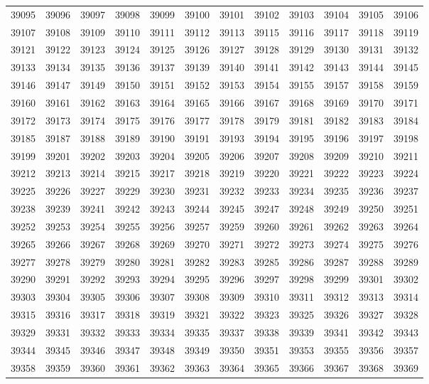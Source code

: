\begin{center}
\begin{longtable}{llllllllllll}
39095 &39096 &39097 &39098 &39099 &39100 &39101 &39102 &39103 &39104 &39105 &39106 \\
39107 &39108 &39109 &39110 &39111 &39112 &39113 &39115 &39116 &39117 &39118 &39119 \\
39121 &39122 &39123 &39124 &39125 &39126 &39127 &39128 &39129 &39130 &39131 &39132 \\
39133 &39134 &39135 &39136 &39137 &39139 &39140 &39141 &39142 &39143 &39144 &39145 \\
39146 &39147 &39149 &39150 &39151 &39152 &39153 &39154 &39155 &39157 &39158 &39159 \\
39160 &39161 &39162 &39163 &39164 &39165 &39166 &39167 &39168 &39169 &39170 &39171 \\
39172 &39173 &39174 &39175 &39176 &39177 &39178 &39179 &39181 &39182 &39183 &39184 \\
39185 &39187 &39188 &39189 &39190 &39191 &39193 &39194 &39195 &39196 &39197 &39198 \\
39199 &39201 &39202 &39203 &39204 &39205 &39206 &39207 &39208 &39209 &39210 &39211 \\
39212 &39213 &39214 &39215 &39217 &39218 &39219 &39220 &39221 &39222 &39223 &39224 \\
39225 &39226 &39227 &39229 &39230 &39231 &39232 &39233 &39234 &39235 &39236 &39237 \\
39238 &39239 &39241 &39242 &39243 &39244 &39245 &39247 &39248 &39249 &39250 &39251 \\
39252 &39253 &39254 &39255 &39256 &39257 &39259 &39260 &39261 &39262 &39263 &39264 \\
39265 &39266 &39267 &39268 &39269 &39270 &39271 &39272 &39273 &39274 &39275 &39276 \\
39277 &39278 &39279 &39280 &39281 &39282 &39283 &39285 &39286 &39287 &39288 &39289 \\
39290 &39291 &39292 &39293 &39294 &39295 &39296 &39297 &39298 &39299 &39301 &39302 \\
39303 &39304 &39305 &39306 &39307 &39308 &39309 &39310 &39311 &39312 &39313 &39314 \\
39315 &39316 &39317 &39318 &39319 &39321 &39322 &39323 &39325 &39326 &39327 &39328 \\
39329 &39331 &39332 &39333 &39334 &39335 &39337 &39338 &39339 &39341 &39342 &39343 \\
39344 &39345 &39346 &39347 &39348 &39349 &39350 &39351 &39353 &39355 &39356 &39357 \\
39358 &39359 &39360 &39361 &39362 &39363 &39364 &39365 &39366 &39367 &39368 &39369 \\

\end{longtable}
\end{center}
